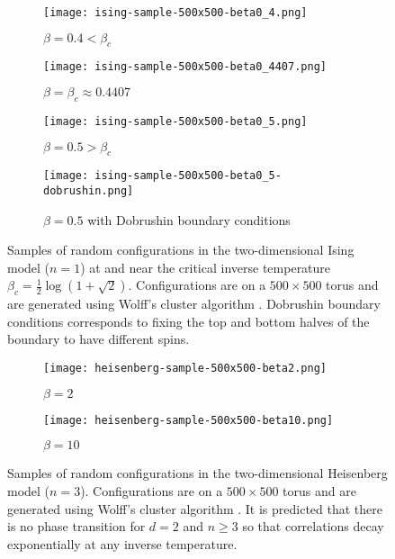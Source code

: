 \documentclass[12pt,reqno]{article}
\begin{document}
\begin{figure}[!ht]
	\centering
	\begin{subfigure}[t]{.49\textwidth}
		\texttt{[image: ising-sample-500x500-beta0\_4.png]}
		\caption{$\beta=0.4<\beta_c$}
		\label{fig:ising-sample-500x500-beta1}
	\end{subfigure}%
	\begin{subfigure}{10pt}
		\quad
	\end{subfigure}%
	\begin{subfigure}[t]{.49\textwidth}
		\texttt{[image: ising-sample-500x500-beta0\_4407.png]}
		\caption{$\beta=\beta_c \approx 0.4407$}
		\label{fig:ising-sample-500x500-beta1_12}
	\end{subfigure}
	\medbreak
	\begin{subfigure}[t]{.49\textwidth}
		\texttt{[image: ising-sample-500x500-beta0\_5.png]}
		\caption{$\beta=0.5>\beta_c$}
		\label{fig:ising-sample-500x500-beta1_5}
	\end{subfigure}%
	\begin{subfigure}{10pt}
		\quad
	\end{subfigure}%
	\begin{subfigure}[t]{.49\textwidth}
		\texttt{[image: ising-sample-500x500-beta0\_5-dobrushin.png]}
		\caption{$\beta=0.5$ with Dobrushin boundary conditions}
		\label{fig:ising-sample-500x500-beta3}
	\end{subfigure}
	\caption{Samples of random configurations in the two-dimensional Ising model ($n=1$) at and near the critical inverse temperature $\beta_c = \tfrac12 \log(1+\sqrt{2})$. Configurations are on a $500\times500$ torus and are generated using Wolff's cluster algorithm \cite{wolff1989collective}. Dobrushin boundary conditions corresponds to fixing the top and bottom halves of the boundary to have different spins.}
	\label{fig:ising-samples}
\end{figure}


\begin{figure}[!ht]
	\centering
	\begin{subfigure}[t]{.49\textwidth}
		\texttt{[image: heisenberg-sample-500x500-beta2.png]}
		\caption{$\beta=2$}
		\label{fig:heisenberg-sample-500x500-beta2}
	\end{subfigure}%
	\begin{subfigure}{10pt}
		\quad
	\end{subfigure}%
	\begin{subfigure}[t]{.49\textwidth}
		\texttt{[image: heisenberg-sample-500x500-beta10.png]}
		\caption{$\beta=10$}
		\label{fig:heisenberg-sample-500x500-beta10}
	\end{subfigure}
	\caption{Samples of random configurations in the two-dimensional Heisenberg model ($n=3$). Configurations are on a $500\times500$ torus and are generated using Wolff's cluster algorithm \cite{wolff1989collective}. It is predicted \cite{polyakov1975interaction} that there is no phase transition for $d=2$ and $n \ge 3$ so that correlations decay exponentially at any inverse temperature.}
	\label{fig:heisenberg-samples}
\end{figure}
\end{document}
